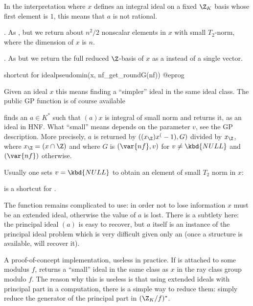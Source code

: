 In the interpretation where $x$ defines an integral ideal on a fixed $\Z_K$
basis whose first element is $1$, this means that $a$ is not rational.

. As ,
but we return about $n^2/2$ nonscalar elements in $x$ with small $T_2$-norm,
where the dimension of $x$ is $n$.

. As  but we
return the full reduced $\Z$-basis of $x$ as a  instead of a single
vector.

 shortcut for
\bprog
  idealpseudomin(x, nf_get_roundG(nf))
@eprog

 \label{se:Ideal_reduction}

Given an ideal $x$ this means finding a ``simpler'' ideal in the same ideal
class. The public GP function is of course available

 finds an $a\in K^*$ such that
$(a) x$ is integral of small norm and returns it, as an ideal in HNF.
What ``small'' means depends on the parameter $v$, see the GP description.
More precisely, $a$ is returned by $((x_\Z) x^(-1),G)$
divided by $x_\Z$, where $x_\Z = (x\cap \Z)$ and where $G$ is
$(\var{nf}, v)$ for $v\neq \kbd{NULL}$ and
$(\var{nf})$ otherwise.

\noindent Usually one sets $v = \kbd{NULL}$ to obtain an element of small $T_2$
norm in $x$:

 is a shortcut for .

The function  remains complicated to use: in order not to lose
information $x$ must be an extended ideal, otherwise the value of $a$ is lost.
There is a subtlety here: the principal ideal $(a)$ is easy to recover, but $a$
itself is an instance of the principal ideal problem which is very difficult
given only an  (once a  structure is available,
 will recover it).

 A proof-of-concept implementation,
useless in practice. If  is attached to some modulus $f$, returns a
``small'' ideal in the same class as $x$ in the ray class group modulo $f$.
The reason why this is useless is that using extended ideals with principal
part in a computation, there is a simple way to reduce them: simply reduce
the generator of the principal part in $(\Z_K/f)^*$.

